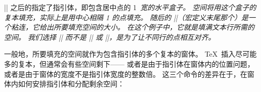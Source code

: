 {{{{{{%
|\leaders| 之后的指定了指引体，即包含居中点的 1\em\ 宽的水平盒子。
空间将用这个盒子的复本填充，实际上是用中心相隔 1\em{} 的点填充。
随后的 |\hfil|（宏定义末尾那个）是一个粘连，它给出所要填充空间的大小。
在这个例子中，它就是填满文本行所需的空间。
我们选择 |\leaders| 而不是 |\cleaders| 或 |\xleaders|，是为了让不同行的点相互对齐。

一般地，所要填充的空间就作为包含指引体的多个复本的窗体。
\TeX\ 插入尽可能多的复本，但通常会有些空间剩下——%
或者是由于指引体在窗体内的位置问题，或者是由于窗体的宽度不是指引体宽度的整数倍。
这三个命令的差异在于，在窗体内如何安排指引体和分配剩余空间：

}}}}}}
